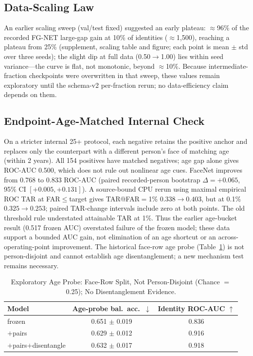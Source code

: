 \documentclass[journal]{IEEEtran}
\begin{document}
\subsection{Data-Scaling Law}\label{sec:res-scaling}
An earlier scaling sweep (val/test fixed) suggested an early plateau: $\approx$96\% of the recorded FG-NET large-gap gain at 10\% of identities ($\approx$1{,}500), reaching a plateau from 25\% (supplement, scaling table and figure; each point is mean $\pm$ std over three seeds); the slight dip at full data (0.50$\rightarrow$1.00) lies within seed variance---the curve is flat, not monotonic, beyond $\approx$10\%. Because intermediate-fraction checkpoints were overwritten in that sweep, these values remain exploratory until the schema-v2 per-fraction rerun; no data-efficiency claim depends on them.

\subsection{Endpoint-Age-Matched Internal Check}\label{sec:res-shortcut}
On a stricter internal 25+ protocol, each negative retains the positive anchor and replaces only the counterpart with a different person's face of matching age (within 2 years). All 154 positives have matched negatives; age gap alone gives ROC-AUC 0.500, which does not rule out nonlinear age cues. FaceNet improves from 0.768 to 0.833 ROC-AUC (paired recorded-person bootstrap $\Delta=+0.065$, 95\% CI $[+0.005,+0.131]$). A source-bound CPU rerun using maximal empirical ROC TAR at FAR$\leq$target gives TAR@FAR$=$1\% $0.338\to0.403$, but at 0.1\% $0.325\to0.253$; paired TAR-change intervals include zero at both points. The old threshold rule understated attainable TAR at 1\%. Thus the earlier age-bucket result (0.517 frozen AUC) overstated failure of the frozen model; these data support a bounded AUC gain, not elimination of an age shortcut or an across-operating-point improvement. The historical face-row age probe (Table~\ref{tab:leakage}) is not person-disjoint and cannot establish age disentanglement; a new mechanism test remains necessary.

\begin{table}[!t]
\renewcommand{\arraystretch}{1.2}
\caption{Exploratory Age Probe: Face-Row Split, Not Person-Disjoint (Chance $=$ 0.25); No Disentanglement Evidence.}
\label{tab:leakage}
\centering
\footnotesize
\begin{tabular}{@{}lcc@{}}
\toprule
Model & Age-probe bal.\ acc.\ $\downarrow$ & Identity ROC-AUC $\uparrow$ \\
\midrule
frozen & 0.651 $\pm$ 0.019 & 0.836 \\
$+$pairs & 0.629 $\pm$ 0.012 & 0.916 \\
$+$pairs$+$disentangle & 0.632 $\pm$ 0.017 & 0.918 \\
\bottomrule
\end{tabular}
\end{table}
\end{document}
